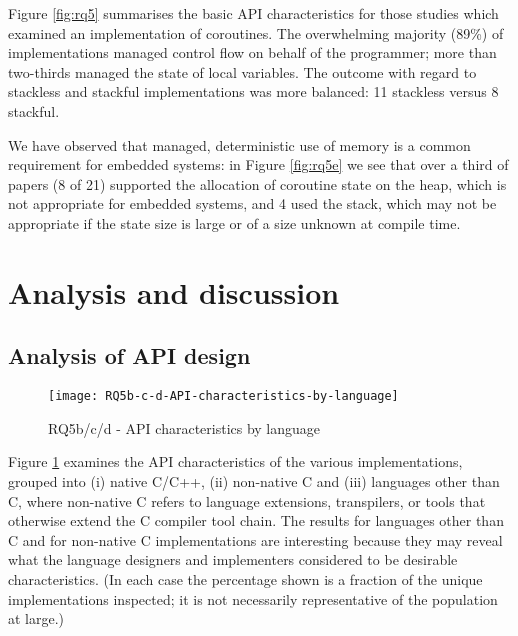 Figure \ref{fig:rq5} summarises the basic API characteristics for those studies which examined an implementation of coroutines. The overwhelming majority (89\%) of implementations managed control flow on behalf of the programmer; more than two-thirds managed the state of local variables. The outcome with regard to stackless and stackful implementations was more balanced: 11 stackless versus 8 stackful.

We have observed that managed, deterministic use of memory is a common requirement for embedded systems: in Figure \ref{fig:rq5e} we see that over a third of papers (8 of 21) supported the allocation of coroutine state on the heap, which is not appropriate for embedded systems, and 4 used the stack, which may not be appropriate if the state size is large or of a size unknown at compile time.

\section{Analysis and discussion}
\label{section:analysis}

\subsection{Analysis of API design}
\label{analysis-of-api-design}

\begin{figure}[h]
	\texttt{[image: RQ5b-c-d-API-characteristics-by-language]}
	\caption{RQ5b/c/d - API characteristics by language}
	\label{fig:rq5bcd}
\end{figure}

%		

Figure \ref{fig:rq5bcd} examines the API characteristics of the various implementations, grouped into (i) native C/C++, (ii) non-native C and (iii) languages other than C, where non-native C refers to language extensions, transpilers, or tools that otherwise extend the C compiler tool chain. The results for languages other than C and for non-native C implementations are interesting because they may reveal what the language designers and implementers considered to be desirable characteristics. (In each case the percentage shown is a fraction of the unique implementations inspected; it is not necessarily representative of the population at large.)

